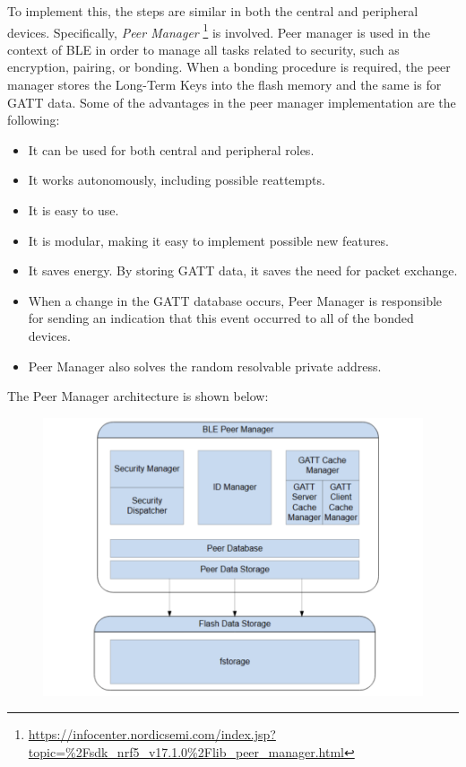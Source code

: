 \documentclass{Configuration_Files/PoliMi3i_thesis}
\begin{document}
To implement this, the steps are similar in both the central and peripheral devices. Specifically, \textit{Peer Manager} \footnote{\url{https://infocenter.nordicsemi.com/index.jsp?topic=\%2Fsdk_nrf5_v17.1.0\%2Flib_peer_manager.html}} is involved. Peer manager is used in the context of BLE in order to manage all tasks related to security, such as encryption, pairing, or bonding. When a bonding procedure is required, the peer manager stores the Long-Term Keys into the flash memory and the same is for GATT data. Some of the advantages in the peer manager implementation are the following:

\begin{itemize}
    \item It can be used for both central and peripheral roles.
    \item It works autonomously, including possible reattempts.
    \item It is easy to use.
    \item It is modular, making it easy to implement possible new features.
    \item It saves energy. By storing GATT data, it saves the need for packet exchange.
    \item When a change in the GATT database occurs, Peer Manager is responsible for sending an indication that this event occurred to all of the bonded devices.
    \item Peer Manager also solves the random resolvable private address.
\end{itemize}

The Peer Manager architecture is shown below:

\begin{figure}[h]
    \centering
    \includegraphics[scale=0.3]{Firmware_security/Screenshot 2024-07-22 at 22.33.12.png}
\end{figure}
\end{document}
